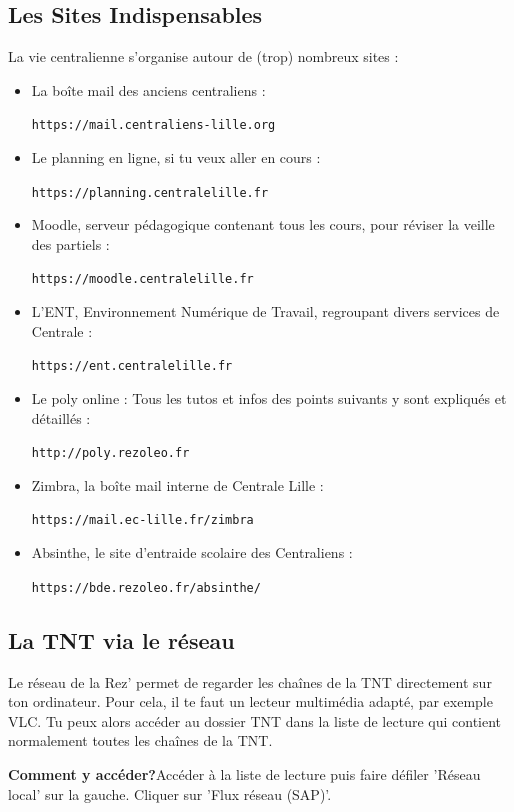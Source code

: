 \documentclass[12pt]{article}
\begin{document}
{  \subsection{Les Sites Indispensables}
    La vie centralienne s’organise autour de (trop) nombreux sites :
    \newline
    \begin{itemize}
      \item La boîte mail des anciens centraliens :
      \begin{center}
	\verb|https://mail.centraliens-lille.org|
      \end{center}
    \item Le planning en ligne, si tu veux aller en cours :
    \begin{center}
      \verb|https://planning.centralelille.fr|
    \end{center}
    \item Moodle, serveur pédagogique contenant tous les cours, pour réviser la veille des partiels : 
    \begin{center}
      \verb|https://moodle.centralelille.fr|
    \end{center}
    \item L’ENT, Environnement Numérique de Travail, regroupant divers services de Centrale : 
    \begin{center}
      \verb|https://ent.centralelille.fr|
    \end{center}
    \item Le poly online : Tous les tutos et infos des points suivants y sont expliqués et détaillés : 
    \begin{center}
      \verb|http://poly.rezoleo.fr|
    \end{center}
    \item Zimbra, la boîte mail interne de Centrale Lille :
    \begin{center}
      \verb|https://mail.ec-lille.fr/zimbra|
    \end{center}
    \item Absinthe, le site d'entraide scolaire des Centraliens :
    \begin{center}
      \verb|https://bde.rezoleo.fr/absinthe/|
    \end{center}
    \end{itemize}
  \subsection{La TNT via le réseau}
    Le réseau de la Rez’ permet de regarder les chaînes de la TNT directement sur ton ordinateur. Pour cela, il te faut un lecteur multimédia adapté, par exemple VLC.
    Tu peux alors accéder au dossier TNT dans la liste de lecture qui contient normalement toutes les chaînes de la TNT.
    \begin{description}
      \item \textbf{Comment y accéder?}\newline Accéder à la liste de lecture puis faire défiler 'Réseau local' sur la gauche. Cliquer sur 'Flux réseau (SAP)'.
    \end{description}
}
\end{document}
